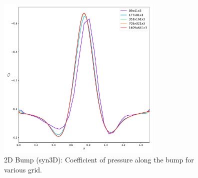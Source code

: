 \begin{figure}[ht!]
\centering
  \includegraphics[width=0.7\textwidth]{figs/2dbump/CpGridStudy.pdf}
    \caption{2D Bump (syn3D): Coefficient of pressure along the bump for various grid.}
    \label{fig:syn2dbumpcpstudy}
\end{figure}

